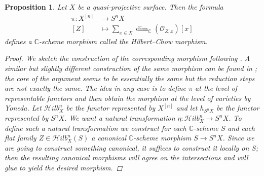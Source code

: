 \documentclass[12pt,a4paper]{amsart}
\theoremstyle{plain}
\newtheorem{prop}[thm]{Proposition}
\theoremstyle{definition}
\theoremstyle{remark}
\begin{document}
\begin{prop}
  Let $X$ be a quasi-projective surface.
  Then the formula
  \begin{align*}
    \pi \colon X^{[n]} & \longrightarrow S^{n}X \\
    [Z] & \longmapsto \sum_{x \in X} \dim_{\mathbb{C}}(\mathscr{O}_{Z,x})[x] 
  \end{align*}
  defines a $\mathbb{C}$-scheme morphism called the \textit{Hilbert--Chow morphism}.
  
  \begin{proof}
    We sketch the construction of the corresponding morphism following \cite[\S 3.2]{leh00}.
    A similar but slightly different construction of the same morphism can be found in \cite[p.~41]{ber08}; the core of the argument seems to be essentially the same but the reduction steps are not exactly the same.
    The idea in any case is to define $\pi$ at the level of representable functors and then obtain the morphism at the level of varieties by Yoneda.
    Let $\mathcal{H}ilb^{n}_{X}$ be the functor represented by $X^{[n]}$ and let $h_{S^{n}X}$ be the functor represented by $S^{n}X$.
    We want a natural transformation $\eta \colon \mathcal{H}ilb^{n}_{X} \to S^{n}X$.
    To define such a natural transformation we construct for each $\mathbb{C}$-scheme $S$ and each flat family $Z \in \mathcal{H}ilb^{n}_{X}(S)$ a canonical $\mathbb{C}$-scheme morphism $S \to S^{n}X$.
    Since we are going to construct something canonical, it suffices to construct it locally on $S$; then the resulting canonical morphisms will agree on the intersections and will glue to yield the desired morphism.


\end{proof}
\end{prop}
\end{document}
